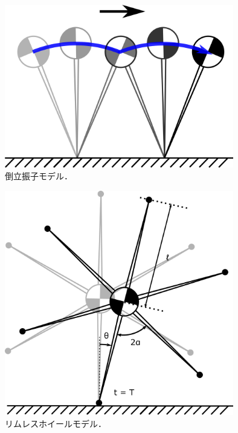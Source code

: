\begin{figure}[htbp]
 \centering
 \includegraphics[clip,width=10.0cm]{./fig/inverted_pendulum_walking.png}
    \caption{倒立振子モデル．\label{ip}}
\end{figure}


\begin{figure}[htbp]
 \centering
 \includegraphics[clip,width=10.0cm]{./fig/rw.png}
    \caption{リムレスホイールモデル．\label{rw}}
\end{figure}



